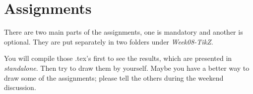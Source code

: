 \documentclass[english]{../TeXTemplate/pkupaper}
\begin{document}
\section{Assignments}
There are two main parts of the assignments, one is mandatory and another is optional.
They are put separately in two folders under \textit{Week08-TikZ}.\par

You will compile those .tex's first to see the results, which are presented in 
\textit{standalone}. Then try to draw them by yourself.
Maybe you have a better way to draw some of the assignments;
please tell the others during the weekend discussion.
\end{document}
